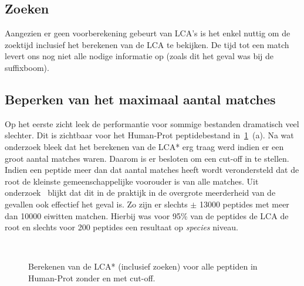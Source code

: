 \subsection{Zoeken}
Aangezien er geen voorberekening gebeurt van LCA's is het enkel nuttig om de zoektijd inclusief het berekenen van de LCA te bekijken.
De tijd tot een match levert ons nog niet alle nodige informatie op (zoals dit het geval was bij de suffixboom).

\subsection{Beperken van het maximaal aantal matches}\label{subsec:maximaal-aantal-matches}
Op het eerste zicht leek de performantie voor sommige bestanden dramatisch veel slechter.
Dit is zichtbaar voor het Human-Prot peptidebestand in~\ref{fig:cutoff_humanprot}~(a).
Na wat onderzoek bleek dat het berekenen van de LCA* erg traag werd indien er een groot aantal matches waren.
Daarom is er besloten om een cut-off in te stellen.
Indien een peptide meer dan dat aantal matches heeft wordt verondersteld dat de root de kleinste gemeenschappelijke voorouder is van alle matches.
Uit onderzoek~\cite{unipept_cutoff} blijkt dat dit in de praktijk in de overgrote meerderheid van de gevallen ook effectief het geval is.
Zo zijn er slechts $\pm$ 13000 peptides met meer dan 10000 eiwitten matchen.
Hierbij was voor 95\% van de peptides de LCA de root en slechts voor 200 peptides een resultaat op \textit{species} niveau.
\\
\begin{figure}[H]
    \centering
    \\[4ex] %

    \caption{Berekenen van de LCA* (inclusief zoeken) voor alle peptiden in Human-Prot zonder en met cut-off.}\label{fig:cutoff_humanprot}
\end{figure}

